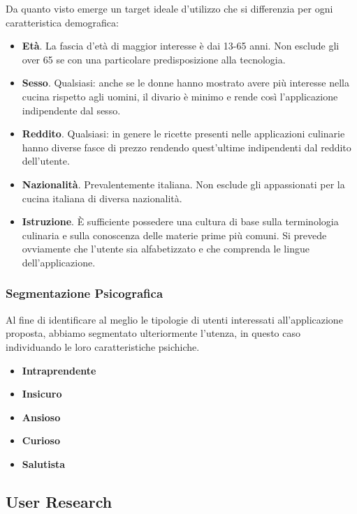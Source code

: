 Da quanto visto emerge un target ideale d'utilizzo che si differenzia per ogni
caratteristica demografica:
\begin{itemize}
\item \textbf{Età}. La fascia d'età di maggior interesse è dai 13-65
anni. Non esclude gli over 65 se con una particolare predisposizione
alla tecnologia.
\item \textbf{Sesso}. Qualsiasi: anche se le donne hanno mostrato avere più
interesse nella cucina rispetto agli uomini, il divario è minimo e rende
così l'applicazione indipendente dal sesso.
\item \textbf{Reddito}. Qualsiasi:
in genere le ricette presenti nelle applicazioni culinarie hanno diverse
fasce di prezzo rendendo quest'ultime indipendenti dal reddito dell'utente.
\item \textbf{Nazionalità}. Prevalentemente italiana. Non esclude gli
appassionati per la cucina italiana di diversa nazionalità.
\item \textbf{Istruzione}. È sufficiente possedere una cultura di base sulla terminologia
culinaria e sulla conoscenza delle materie prime più comuni. Si prevede
ovviamente che l'utente sia alfabetizzato e che comprenda le lingue
dell'applicazione. 

\end{itemize}

\subsubsection{Segmentazione Psicografica}
Al fine di identificare al meglio le tipologie di
utenti interessati all'applicazione proposta, abbiamo segmentato
ulteriormente l'utenza, in questo caso individuando le loro caratteristiche
psichiche.

\begin{itemize}
\item \textbf{Intraprendente}
\item \textbf{Insicuro}
\item \textbf{Ansioso}
\item \textbf{Curioso}
\item \textbf{Salutista}
\end{itemize}


\subsection{User Research}

